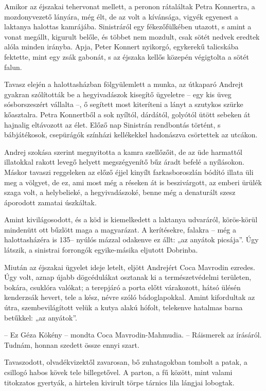 \documentclass{IEEEtran}
\begin{document}
Amikor az éjszakai tehervonat mellett, a peronon rátaláltak Petra Konnertra, a
mozdonyvezető lányára, még élt, de az volt a kívánsága, vigyék egyenest a
laktanya halottas kamrájába. Sinistráról egy fékezőfülkében utazott, s amint a
vonat megállt, kigurult belőle, és többet nem mozdult, csak sötét nedvek
eredtek alóla minden irányba. Apja, Peter Konnert nyikorgó, egykerekű
talicskába fektette, mint egy zsák gabonát, s az éjszaka kellős közepén
végigtolta a sötét falun.

Tavasz elején a halottasházban fölgyülemlett a munka, az útkaparó Andrejt
gyakran szólították be a hegyivadászok kisegítő ügyeletre – egy kis üveg
sósborszeszért vállalta –, ő segített most kiteríteni a lányt a szutykos
szürke kőasztalra. Petra Konnertből a sok nyíltól, dárdától, golyótól ütött
sebeken át hajnalig eltávozott az élet. Előző nap Sinistrán rendbontás
történt, s bábjátékosok, csepürágók színházi kellékekkel hadonászva csörtettek
az utcákon.

Andrej szokása szerint megnyitotta a kamra szellőzőit, de az üde harmattól
illatokkal rakott levegő helyett megszégyenítő bűz áradt befelé a nyílásokon.
Máskor tavaszi reggeleken az előző éjjel kinyílt farkasboroszlán bódító illata
üli meg a völgyet, de ez, ami most még a réseken át is beszivárgott, az emberi
ürülék szaga volt, a helybelieké, a hegyivadászoké, benne még a denaturált
szesz áporodott zamatai úszkáltak.

Amint kivilágosodott, és a köd is kiemelkedett a laktanya udvaráról,
körös-körül mindenütt ott bűzlött maga a magyarázat. A kerítésekre, falakra –
még a halottasházéra is 135– nyúlós mázzal odakenve ez állt: „az anyátok
picsája”. Úgy látszik, a sinistrai forrongók egyike-másika eljutott Dobrinba.

Miután az éjszakai ügyelet ideje letelt, eljött Andrejért Coca Mavrodin
ezredes. Úgy volt, aznap újabb dögcédulákat osztanak ki a természetvédelmi
területen, bokára, csuklóra valókat; a terepjáró a porta előtt várakozott,
hátsó ülésén kenderzsák hevert, tele a kész, névre szóló bádoglapokkal. Amint
kifordultak az útra, szembevilágított velük a kutya alakú hófolt, telekenve
hatalmas barna betűkkel: „az anyátok”.

– Ez Géza Kökény – mondta Coca Mavrodin-Mahmudia. – Ráismerek az írásáról.
Tudnám, honnan szedett össze ennyi szart.

Tavaszodott, olvadékvizektől zavarosan, bő zuhatagokban tombolt a patak, a
csillogó habos kövek tele billegetővel. A parton, a fű között, mint valami
titokzatos gyertyák, a hirtelen kivirult törpe tárnics lila lángjai lobogtak.
\end{document}
